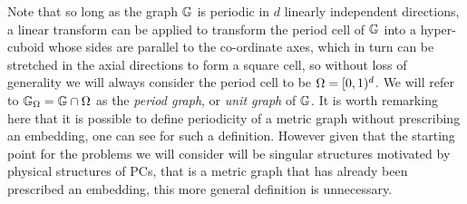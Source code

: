 Note that so long as the graph $\mathbb{G}$ is periodic in $d$ linearly independent directions, a linear transform can be applied to transform the period cell of $\mathbb{G}$ into a hyper-cuboid whose sides are parallel to the co-ordinate axes, which in turn can be stretched in the axial directions to form a square cell, so without loss of generality we will always consider the period cell to be $\Omega=[0,1)^d$.
We will refer to $\mathbb{G}_{\Omega} = \mathbb{G} \cap \Omega$ as the \emph{period graph}, or \emph{unit graph} of $\mathbb{G}$.
It is worth remarking here that it is possible to define periodicity of a metric graph without prescribing an embedding, one can see \cite[Chapter~4]{berkolaiko2013introduction} for such a definition.
However given that the starting point for the problems we will consider will be singular structures motivated by physical structures of PCs, that is a metric graph that has already been prescribed an embedding, this more general definition is unnecessary.

